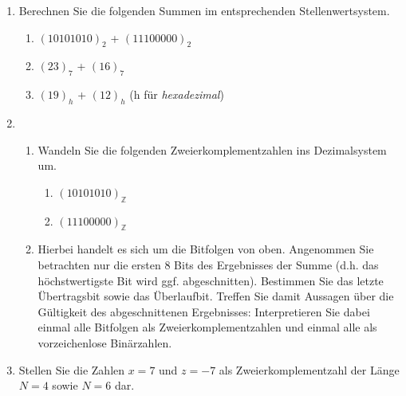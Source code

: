\begin{enumerate}
	\item Berechnen Sie die folgenden Summen im entsprechenden Stellenwertsystem.
		\begin{enumerate}
			\item  $(10101010)_2$ + $(11100000)_2$
			\item $(23)_7$ + $(16)_7$
			\item $(19)_{h}$ + $(12)_{h}$ (h für \textit{hexadezimal})
		\end{enumerate}
	\item 
	\begin{enumerate}
		\item Wandeln Sie die folgenden Zweierkomplementzahlen ins Dezimalsystem um.
		\begin{enumerate}
			\item $(10101010)_{\mathbb{Z}}$
			\item $(11100000)_{\mathbb{Z}}$
		\end{enumerate}
		\item Hierbei handelt es sich um die Bitfolgen von oben. Angenommen Sie betrachten nur die ersten 8 Bits des Ergebnisses der Summe (d.h. das höchstwertigste Bit wird ggf. abgeschnitten). Bestimmen Sie das letzte Übertragsbit sowie das Überlaufbit.  Treffen Sie damit Aussagen über die Gültigkeit des abgeschnittenen Ergebnisses: Interpretieren Sie dabei einmal alle Bitfolgen als Zweierkomplementzahlen und einmal alle als vorzeichenlose Binärzahlen.
	\end{enumerate}
	\item Stellen Sie die Zahlen $x = 7$ und $z = -7$ als Zweierkomplementzahl der Länge $N = 4$ sowie $N = 6$ dar.
\end{enumerate}
